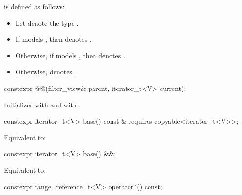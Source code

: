 \pnum
{} is defined as follows:
\begin{itemize}
\item Let  denote the type
.

\item If  models
,
then  denotes .

\item Otherwise, if   models
,
then  denotes .

\item Otherwise,  denotes .
\end{itemize}

%
\begin{itemdecl}
constexpr @@(filter_view& parent, iterator_t<V> current);
\end{itemdecl}

\begin{itemdescr}
\pnum
\effects
Initializes  with  and
 with .
\end{itemdescr}

%
\begin{itemdecl}
constexpr iterator_t<V> base() const &
  requires copyable<iterator_t<V>>;
\end{itemdecl}

\begin{itemdescr}
\pnum
\effects
Equivalent to: 
\end{itemdescr}

%
\begin{itemdecl}
constexpr iterator_t<V> base() &&;
\end{itemdecl}

\begin{itemdescr}
\pnum
\effects
Equivalent to: 
\end{itemdescr}

%
\begin{itemdecl}
constexpr range_reference_t<V> operator*() const;
\end{itemdecl}

